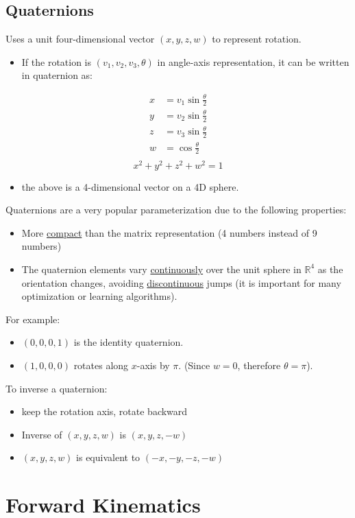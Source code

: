 \documentclass[10pt]{article}
\begin{document}
\subsection*{Quaternions}
Uses a unit four-dimensional vector $(x, y, z, w)$ to represent rotation.
\begin{itemize}
	\item If the rotation is $(v_1, v_2, v_3, \theta)$ in angle-axis representation, it can be written in quaternion as:
\end{itemize}
\begin{align*}
    x &= v_1 \sin \frac{\theta}{2}\\
    y &= v_2 \sin \frac{\theta}{2}\\
    z &= v_3 \sin \frac{\theta}{2}\\
    w &= \cos \frac{\theta}{2}\\
\end{align*}
\[x^2 + y^2 + z^2 + w^2 = 1\]
\begin{itemize}
	\item the above is a 4-dimensional vector on a 4D sphere.
\end{itemize}
Quaternions are a very popular parameterization due to the following properties:
\begin{itemize}
	\item More \underline{compact} than the matrix representation (4 numbers instead of 9 numbers)
	\item The quaternion elements vary \underline{continuously} over the unit sphere in $\mathbb{R}^4$ as the orientation changes, avoiding \underline{discontinuous} jumps (it is important for many optimization or learning algorithms).
\end{itemize}
For example:
\begin{itemize}
	\item $(0, 0, 0, 1)$ is the identity quaternion.
	\item $(1, 0, 0, 0)$ rotates along $x$-axis by $\pi$.  (Since $w = 0$, therefore $\theta = \pi$).
\end{itemize}
To inverse a quaternion:
\begin{itemize}
	\item keep the rotation axis, rotate backward
	\item Inverse of $(x, y, z, w)$ is $(x, y, z, -w)$
	\item $(x, y, z, w)$ is equivalent to $(-x, -y, -z, -w)$
\end{itemize}

\section*{Forward Kinematics}
\end{document}
